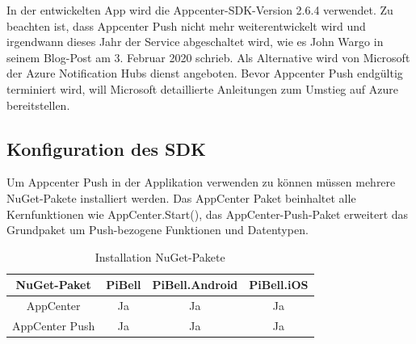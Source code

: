 In der entwickelten App wird die Appcenter-SDK-Version 2.6.4 verwendet. Zu beachten ist, dass Appcenter Push nicht mehr weiterentwickelt wird und irgendwann dieses Jahr der Service abgeschaltet wird, wie es John Wargo in seinem Blog-Post am 3. Februar 2020 schrieb. Als Alternative wird von Microsoft der Azure Notification Hubs dienst angeboten. Bevor Appcenter Push endgültig terminiert wird, will Microsoft detaillierte Anleitungen zum Umstieg auf Azure bereitstellen.\par

\subsection{Konfiguration des SDK}
Um Appcenter Push in der Applikation verwenden zu können müssen mehrere NuGet-Pakete installiert werden.
Das AppCenter Paket beinhaltet alle Kernfunktionen wie AppCenter.Start(), das AppCenter-Push-Paket erweitert das Grundpaket um Push-bezogene Funktionen und Datentypen.
\begin{table}[H]
    \centering\begin{tabular}{|c|c|c|c|}
        \hline
        NuGet-Paket & PiBell & PiBell.Android & PiBell.iOS\\
        \hline
        AppCenter & Ja & Ja & Ja\\
        AppCenter Push & Ja & Ja & Ja\\
        \hline    
    \end{tabular}
    \caption{Installation NuGet-Pakete}
\end{table}